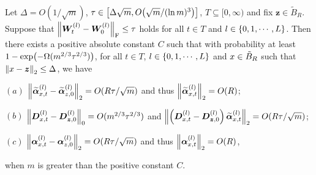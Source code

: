 \begin{lemma}
  \label{lem:NN_forward_perturbation}
  Let $\Delta=O(1/\sqrt{m})$, $\tau\in\zk{\Delta\sqrt{m},O\xkm{{\sqrt{m}}/{(\ln m)^3}}}$, $T\subseteq [0,\infty)$ and fix ${\bm{z}} \in\tilde{B}_R$.
  Suppose that $\norm{\bm{W}^{(l)}_t - \bm{W}^{(l)}_0 }_{\mathrm{F}}\leq\tau$ holds for all $t\in T$ and $l\in\left\{0,1,\cdots,L\right\}$.
  Then there exists a positive absolute constant $C$ such that with probability at least $1-\exp\xkm{-\Omega(m^{2/3}\tau^{2/3})}$, for all $t\in T$, $l\in\left\{0,1,\cdots,L\right\}$ and $x \in\tilde{B}_R$ such that $\norm{x-\bm{z}}_2 \leq \Delta$, we have

  $(a)$ $\norm{\widetilde{\bm{\alpha}}^{(l)}_{x,t} - \widetilde{\bm{\alpha}}_{z,0}^{(l)}}_2 = O(R \tau/\sqrt{m})$ and thus $\norm{\widetilde{\bm{\alpha}}^{(l)}_{x,t}}_2=O(R)$;

  $(b)$ $\norm{\bm{D}_{x,t}^{(l)} - \bm{D}_{{\bm{z}},0}^{(l)}}_0 = O(m^{2/3} \tau^{2/3})$ and $\norm{\left(\bm{D}_{x,t}^{(l)} - \bm{D}_{{\bm{z}},0}^{(l)}\right)\widetilde{\bm{\alpha}}_{x,t}^{(l)}}_2= O(R{\tau}/{\sqrt{m}})$;

  $(c)$ $\norm{{\bm{\alpha}}^{(l)}_{x,t} - {\bm{\alpha}}_{z,0}^{(l)}}_2 = O(R \tau/\sqrt{m})$ and thus $\norm{{\bm{\alpha}}^{(l)}_{x,t}}_2=O(R)$,

  \noindent when $m$ is greater than the positive constant $C$.
\end{lemma}
